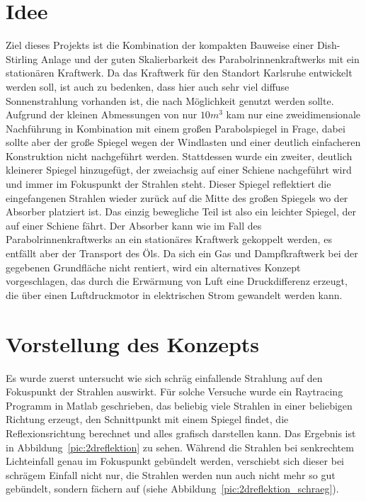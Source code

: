 \documentclass[fontsize=10pt,paper=a4,bibliography=totoc]{scrartcl}
\begin{document}
\section{Idee}
Ziel dieses Projekts ist die Kombination der kompakten Bauweise einer Dish-Stirling Anlage und der guten Skalierbarkeit des Parabolrinnenkraftwerks mit ein stationären Kraftwerk. Da das Kraftwerk für den Standort Karlsruhe entwickelt werden soll, ist auch zu bedenken, dass hier auch sehr viel diffuse Sonnenstrahlung vorhanden ist, die nach Möglichkeit genutzt werden sollte. Aufgrund der kleinen Abmessungen von nur $10\unit{m}^3$ kam nur eine zweidimensionale Nachführung in Kombination mit einem großen Parabolspiegel in Frage, dabei sollte aber der große Spiegel wegen der Windlasten und einer deutlich einfacheren Konstruktion nicht nachgeführt werden. Stattdessen wurde ein zweiter, deutlich kleinerer Spiegel hinzugefügt, der zweiachsig auf einer Schiene nachgeführt wird und immer im Fokuspunkt der Strahlen steht. Dieser Spiegel reflektiert die eingefangenen Strahlen wieder zurück auf die Mitte des großen Spiegels wo der Absorber platziert ist. Das einzig bewegliche Teil ist also ein leichter Spiegel, der auf einer Schiene fährt. Der Absorber kann wie im Fall des Parabolrinnenkraftwerks an ein stationäres Kraftwerk gekoppelt werden, es entfällt aber der Transport des Öls. Da sich ein Gas und Dampfkraftwerk bei der gegebenen Grundfläche nicht rentiert, wird ein alternatives Konzept vorgeschlagen, das durch die Erwärmung von Luft eine Druckdifferenz erzeugt, die über einen Luftdruckmotor in elektrischen Strom gewandelt werden kann.

\section{Vorstellung des Konzepts}
Es wurde zuerst untersucht wie sich schräg einfallende Strahlung auf den Fokuspunkt der Strahlen auswirkt. Für solche Versuche wurde ein Raytracing Programm in Matlab geschrieben, das beliebig viele Strahlen in einer beliebigen Richtung erzeugt, den Schnittpunkt mit einem Spiegel findet, die Reflexionsrichtung berechnet und alles grafisch darstellen kann. Das Ergebnis ist in Abbildung~\ref{pic:2dreflektion} zu sehen. Während die Strahlen bei senkrechtem Lichteinfall genau im Fokuspunkt gebündelt werden, verschiebt sich dieser
bei schrägem Einfall%
nicht nur, die Strahlen werden nun auch nicht mehr so gut gebündelt, sondern fächern auf (siehe Abbildung~\ref{pic:2dreflektion_schraeg}). 
\end{document}
